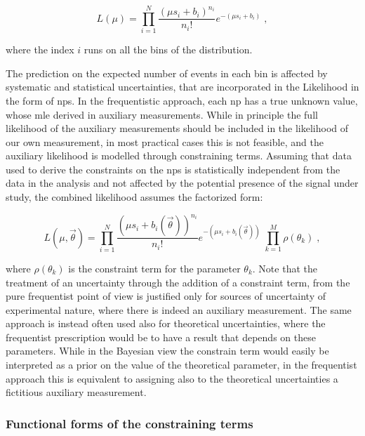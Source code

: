 \begin{equation}
\label{eq:stat:lik_no_sys}
L(\mu) =
\prod_{i=1}^N \frac{ (\mu s_{i} +
b_{i} )^{n_{i}} }{ n_{i}! }
e^{- (\mu s_{i} + b_{i}) } \; ,
\end{equation}

\noindent where the index $i$ runs on all the bins of the distribution.

The prediction on the expected number of events in each bin is affected by systematic and statistical uncertainties, that are incorporated in the Likelihood in the form of \glspl{np}. 
In the frequentistic approach, each \gls{np} has a true unknown value, whose \gls{mle} derived in auxiliary measurements. 
While in principle the full likelihood of the auxiliary measurements should be included in the likelihood of our own measurement, 
in most practical cases this is not feasible, and the auxiliary likelihood is modelled through constraining terms. 
Assuming that data used to derive the constraints on the \glspl{np} is statistically independent from the data in the analysis and not affected by the potential presence of the signal under study, the combined likelihood assumes the factorized form:

\begin{equation}
\label{eq:stat:lik_sys}
L(\mu, \vec{\theta}) =
\prod_{i=1}^N \frac{ (\mu s_{i} +
b_{i}(\vec{\theta}) )^{n_{i}} }{ n_{i}! }
e^{- (\mu s_{i} + b_{i}(\vec{\theta})) }   \;
\prod_{k=1}^M \rho( \theta_k) \; ,
\end{equation}

\noindent where $\rho( \theta_k)$ is the constraint term for the parameter $\theta_k$. Note that the treatment of an uncertainty through the addition of a constraint term, from the pure frequentist point of view is justified only for sources of uncertainty of experimental nature, where there is indeed an auxiliary measurement. The same approach is instead often used also for theoretical uncertainties, where the frequentist prescription would be to have a result that depends on these parameters. While in the Bayesian view the constrain term would easily be interpreted as a prior on the value of the theoretical parameter, in the frequentist approach this is equivalent to assigning also to the theoretical uncertainties a fictitious auxiliary measurement. 


\subsubsection*{Functional forms of the constraining terms}

